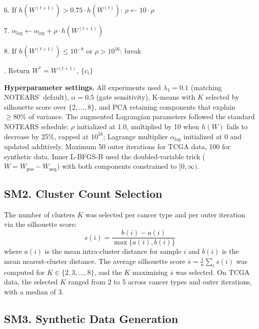 \documentclass[11pt,a4paper]{article}
\begin{document}
\noindent \hspace{1em} 6. \quad If $h(W^{(t+1)}) > 0.75 \cdot h(W^{(t)})$: $\rho \leftarrow 10 \cdot \rho$

\noindent \hspace{1em} 7. \quad $\alpha_{\text{lag}} \leftarrow \alpha_{\text{lag}} + \rho \cdot h(W^{(t+1)})$

\noindent \hspace{1em} 8. \quad If $h(W^{(t+1)}) \leq 10^{-8}$ or $\rho > 10^{16}$: break

. Return $W^* = W^{(t+1)}$, $\{c_i\}$

\vspace{0.3em}
\noindent\textbf{Hyperparameter settings.} All experiments used $\lambda_1 = 0.1$ (matching NOTEARS' default), $\alpha = 0.5$ (gate sensitivity), K-means with $K$ selected by silhouette score over $\{2,\ldots,8\}$, and PCA retaining components that explain $\geq 80\%$ of variance. The augmented Lagrangian parameters followed the standard NOTEARS schedule: $\rho$ initialized at 1.0, multiplied by 10 when $h(W)$ fails to decrease by 25\%, capped at $10^{16}$; Lagrange multiplier $\alpha_{\text{lag}}$ initialized at 0 and updated additively. Maximum 50 outer iterations for TCGA data, 100 for synthetic data. Inner L-BFGS-B used the doubled-variable trick ($W = W_{\text{pos}} - W_{\text{neg}}$) with both components constrained to $[0, \infty)$.

\subsection*{SM2. Cluster Count Selection}

The number of clusters $K$ was selected per cancer type and per outer iteration via the silhouette score:
\[
s(i) = \frac{b(i) - a(i)}{\max\{a(i), b(i)\}}
\]
where $a(i)$ is the mean intra-cluster distance for sample $i$ and $b(i)$ is the mean nearest-cluster distance. The average silhouette score $\bar{s} = \frac{1}{n}\sum_i s(i)$ was computed for $K \in \{2, 3, \ldots, 8\}$, and the $K$ maximizing $\bar{s}$ was selected. On TCGA data, the selected $K$ ranged from 2 to 5 across cancer types and outer iterations, with a median of 3.

\subsection*{SM3. Synthetic Data Generation}
\end{document}
